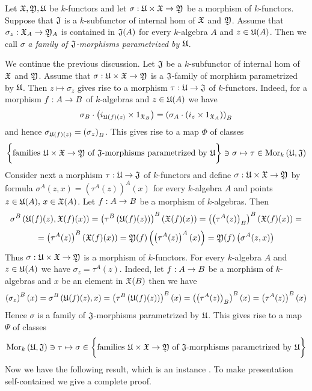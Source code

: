 \begin{definition}
Let ${\mathfrak X}, {\mathfrak Y},{\mathfrak U}$ be $k$-functors and let $\sigma:{\mathfrak U}\times {\mathfrak X} \rightarrow {\mathfrak Y}$ be a morphism of $k$-functors. Suppose that ${\mathfrak J}$ is a $k$-subfunctor of internal hom of ${\mathfrak X}$ and ${\mathfrak Y}$. Assume that $\sigma_z:{\mathfrak X}_A\rightarrow {\mathfrak Y}_A$ is contained in ${\mathfrak J}(A)$ for every $k$-algebra $A$ and $z\in {\mathfrak U}(A)$. Then we call $\sigma$ \textit{a family of ${\mathfrak J}$-morphisms parametrized by ${\mathfrak U}$}.
\end{definition}
\noindent
We continue the previous discussion. Let ${\mathfrak J}$ be a $k$-subfunctor of internal hom of ${\mathfrak X}$ and ${\mathfrak Y}$. Assume that $\sigma:{\mathfrak U}\times {\mathfrak X}\rightarrow {\mathfrak Y}$ is a ${\mathfrak J}$-family of morphism parametrized by ${\mathfrak U}$. Then $z\mapsto \sigma_z$ gives rise to a morphism $\tau:{\mathfrak U}\rightarrow {\mathfrak J}$ of $k$-functors. Indeed, for a morphism $f:A\rightarrow B$ of $k$-algebras and $z\in {\mathfrak U}(A)$ we have
$$\sigma_B\cdot \left(i_{{\mathfrak U}(f)(z)}\times 1_{{\mathfrak X}_B}\right) = \left(\sigma_A\cdot \left(i_{z}\times 1_{{\mathfrak X}_A}\right)\right)_B $$
and hence $\sigma_{{\mathfrak U}(f)(z)} = \left(\sigma_z\right)_B$. This gives rise to a map $\Phi$ of classes
$$\bigg\{\mbox{families }{\mathfrak U}\times {\mathfrak X}\rightarrow {\mathfrak Y}\mbox{ of }{\mathfrak J}\mbox{-morphisms parametrized by }{\mathfrak U}\bigg\}\ni \sigma\mapsto \tau\in \mathrm{Mor}_k\left({\mathfrak U},{\mathfrak J}\right)$$
Consider next a morphism $\tau:{\mathfrak U}\rightarrow {\mathfrak J}$ of $k$-functors and define $\sigma:{\mathfrak U}\times {\mathfrak X}\rightarrow {\mathfrak Y}$ by formula $\sigma^A(z,x) = \left(\tau^A(z)\right)^A(x)$ for every $k$-algebra $A$ and points $z\in {\mathfrak U}(A),\,x\in {\mathfrak X}(A)$. Let $f:A\rightarrow B$ be a morphism of $k$-algebras. Then
$$\sigma^B\left({\mathfrak U}(f)(z),{\mathfrak X}(f)(x)\right) = \left(\tau^B\left({\mathfrak U}(f)(z)\right)\right)^B\left({\mathfrak X}(f)(x)\right) = \left(\left(\tau^A(z)\right)_B\right)^B\left({\mathfrak X}(f)(x)\right) =$$
$$ = \left(\tau^A(z)\right)^B\left({\mathfrak X}(f)(x)\right) = {\mathfrak Y}(f)\left(\left(\tau^A(z)\right)^A(x)\right) = {\mathfrak Y}(f)\left(\sigma^A(z,x)\right)$$
Thus $\sigma:{\mathfrak U}\times {\mathfrak X}\rightarrow {\mathfrak Y}$ is a morphism of $k$-functors. For every $k$-algebra $A$ and $z\in{\mathfrak U}(A)$ we have $\sigma_z = \tau^A(z)$. Indeed, let $f:A\rightarrow B$ be a morphism of $k$-algebras and $x$ be an element in ${\mathfrak X}(B)$ then we have
$$\left(\sigma_z\right)^B(x) = \sigma^B\left({\mathfrak U}(f)(z),x\right) = \left(\tau^B\left({\mathfrak U}(f)(z)\right)\right)^B(x) = \left(\left(\tau^A(z)\right)_B\right)^B(x) = \left(\tau^A(z)\right)^B(x)$$
Hence $\sigma$ is a family of ${\mathfrak J}$-morphisms parametrized by ${\mathfrak U}$. This gives rise to a map $\Psi$ of classes
$$\mathrm{Mor}_k\left({\mathfrak U},{\mathfrak J}\right) \ni \tau \mapsto \sigma\in \bigg\{\mbox{families }{\mathfrak U}\times {\mathfrak X}\rightarrow {\mathfrak Y}\mbox{ of }{\mathfrak J}\mbox{-morphisms parametrized by }{\mathfrak U}\bigg\}$$
Now we have the following result, which is an instance {\cite[Theorem 6.3]{Presheaves}}. To make presentation self-contained we give a complete proof.  


